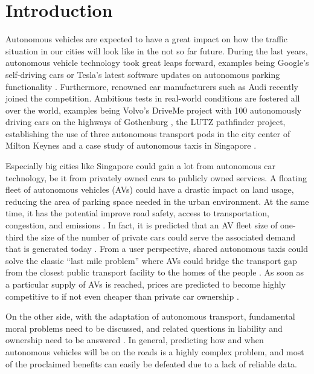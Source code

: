 \section{Introduction}

Autonomous vehicles are expected to have a great impact on how the traffic situation
in our cities will look like in the not so far future. During the last years, autonomous
vehicle technology took great leaps forward, examples being Google's self-driving cars
\citep{Google2016} or Tesla's latest software updates on autonomous parking functionality \citep{Tesla2016}.
Furthermore, renowned car manufacturers such as Audi recently joined the competition.
Ambitious tests in real-world conditions are fostered all over the world, examples being Volvo's
DriveMe project with 100 autonomously driving cars on the highways of Gothenburg \citep{Gothenburg2016},
the LUTZ pathfinder project, establishing the use of three autonomous transport pods
in the city center of Milton Keynes \citep{MiltonKeynes2016} and a case study of
autonomous taxis in Singapore \citep{LTA2016}.

Especially big cities like Singapore could gain a lot from autonomous car technology,
be it from privately owned cars to publicly owned services. A floating fleet of
autonomous vehicles (AVs) could have a drastic impact on land usage, reducing the area of parking
space needed in the urban environment. At the same time, it has the potential improve road safety, access to transportation,
congestion, and emissions \citep{Kheong2014}. In fact, it is predicted
that an AV fleet size of one-third the size of the number of private cars could
serve the associated demand that is generated today \citep{Spieser2014}. From a user perspective, shared autonomous taxis could solve the classic ``last mile problem'' where AVs could
bridge the transport gap from the closest public transport facility to the homes
of the people \citep{Litman2014}. As soon as a particular supply of AVs is reached, prices are predicted
to become highly competitive to if not even cheaper than private car ownership \citep{Chen16}.

On the other side, with the adaptation of autonomous transport, fundamental moral
problems \citep{Hevelke2015a} need to be discussed, and related questions in liability and
ownership need to be answered \citep{Anderson2014a}. In general, predicting how and when autonomous
vehicles will be on the roads is a highly complex problem, and most of the proclaimed
benefits can easily be defeated due to a lack of reliable data.

